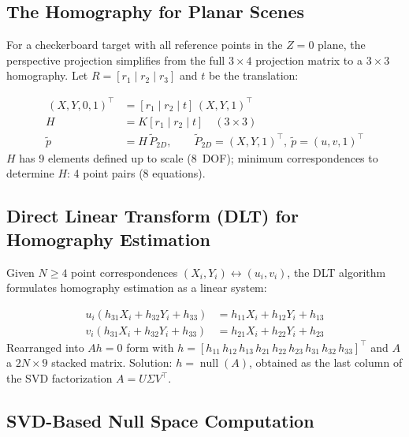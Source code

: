 \subsection{The Homography for Planar Scenes}

For a checkerboard target with all reference points in the $Z=0$ plane, the perspective projection simplifies from the full $3\times4$ projection matrix to a $3\times3$ homography. Let $R=[r_1\mid r_2\mid r_3]$ and $t$ be the translation:

\begin{eqblock}
\begin{align}
[r_1\mid r_2\mid r_3\mid t]\,(X,Y,0,1)^\top &= [r_1\mid r_2\mid t]\,(X,Y,1)^\top \\
H &= K[r_1\mid r_2\mid t] \quad (3\times3) \\
\tilde p &= H\, \tilde P_{2D}, \qquad \tilde P_{2D} = (X,Y,1)^\top,\ \tilde p = (u,v,1)^\top
\end{align}
$H$ has 9 elements defined up to scale (8~DOF); minimum correspondences to determine $H$: 4 point pairs (8 equations).
\end{eqblock}

\subsection{Direct Linear Transform (DLT) for Homography Estimation}

Given $N \geq 4$ point correspondences $(X_i,Y_i) \leftrightarrow (u_i,v_i)$, the DLT algorithm formulates homography estimation as a linear system:

\begin{eqblock}
\begin{align}
u_i(h_{31}X_i + h_{32}Y_i + h_{33}) &= h_{11}X_i + h_{12}Y_i + h_{13} \\
v_i(h_{31}X_i + h_{32}Y_i + h_{33}) &= h_{21}X_i + h_{22}Y_i + h_{23}
\end{align}
Rearranged into $Ah=0$ form with $h=[h_{11}\,h_{12}\,h_{13}\,h_{21}\,h_{22}\,h_{23}\,h_{31}\,h_{32}\,h_{33}]^\top$ and $A$ a $2N\times9$ stacked matrix. Solution: $h = \operatorname{null}(A)$, obtained as the last column of the SVD factorization $A = U\Sigma V^\top$.
\end{eqblock}

\subsection{SVD-Based Null Space Computation}

